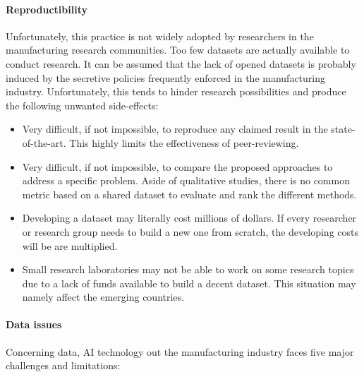 \paragraph{Reproductibility}


Unfortunately, this practice is not widely adopted by researchers in the manufacturing research
communities. Too few datasets are actually available to conduct research. It can be assumed that
the lack of opened datasets is probably induced by the secretive policies frequently enforced in the manufacturing industry. Unfortunately, this tends to hinder research possibilities and produce the following unwanted side-effects:

\begin{itemize}
    \item Very difficult, if not impossible, to reproduce any claimed result in the state-of-the-art. This highly limits the effectiveness of peer-reviewing.
    \item Very difficult, if not impossible, to compare the proposed approaches to address a specific problem. Aside of qualitative studies, there is no common metric based on a shared dataset to evaluate and rank the different methods.
    \item Developing a dataset may literally cost millions of dollars. If every researcher or research group needs to build a new one from scratch, the developing costs will be are multiplied.
    \item Small research laboratories may not be able to work on some research topics due to a lack of funds available to build a decent dataset. This situation may namely affect the emerging countries.
\end{itemize}



\paragraph{Data issues}


Concerning data, AI technology out the manufacturing industry faces five major challenges and limitations: 

